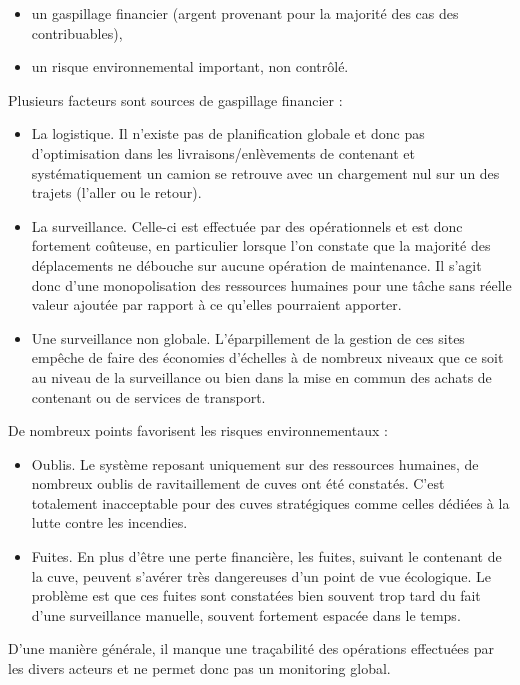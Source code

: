 \documentclass[a4paper]{article}
\begin{document}
\begin{itemize}
\item un gaspillage financier (argent provenant pour la majorité des cas des contribuables),
\item un risque environnemental important, non contrôlé.
\end{itemize}

Plusieurs facteurs sont sources de gaspillage financier :

\begin{itemize}
\item La logistique. Il n'existe pas de planification globale et donc pas d'optimisation dans les livraisons/enlèvements de contenant et systématiquement un camion se retrouve avec un chargement nul sur un des trajets (l'aller ou le retour).
\item La surveillance. Celle-ci est effectuée par des opérationnels et est donc fortement coûteuse, en particulier lorsque l'on constate que la majorité des déplacements ne débouche sur aucune opération de maintenance. Il s'agit donc d'une monopolisation des ressources humaines pour une tâche sans réelle valeur ajoutée par rapport à ce qu'elles pourraient apporter.
\item Une surveillance non globale. L'éparpillement de la gestion de ces sites empêche de faire des économies d'échelles à de nombreux niveaux que ce soit au niveau de la surveillance ou bien dans la mise en commun des achats de contenant ou de services de transport.
\end{itemize}

De nombreux points favorisent les risques environnementaux :

\begin{itemize}
\item Oublis. Le système reposant uniquement sur des ressources humaines, de nombreux oublis de ravitaillement de cuves ont été constatés. C'est totalement inacceptable pour des cuves stratégiques comme celles dédiées à la lutte contre les incendies.
\item Fuites. En plus d'être une perte financière, les fuites, suivant le contenant de la cuve, peuvent s'avérer très dangereuses d'un point de vue écologique. Le problème est que ces fuites sont constatées bien souvent trop tard du fait d'une surveillance manuelle, souvent fortement espacée dans le temps.
\end{itemize}

D'une manière générale, il manque une traçabilité des opérations effectuées par les divers acteurs et ne permet donc pas un monitoring global.
\end{document}
